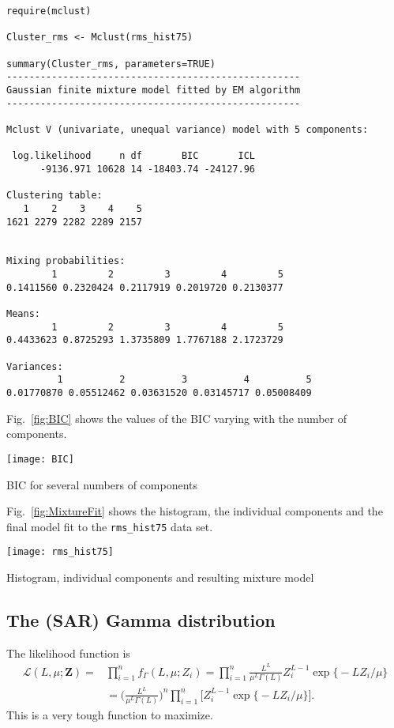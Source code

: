 \begin{lstlisting}
require(mclust)

Cluster_rms <- Mclust(rms_hist75)

summary(Cluster_rms, parameters=TRUE)
----------------------------------------------------
Gaussian finite mixture model fitted by EM algorithm 
----------------------------------------------------

Mclust V (univariate, unequal variance) model with 5 components:

 log.likelihood     n df       BIC       ICL
      -9136.971 10628 14 -18403.74 -24127.96

Clustering table:
   1    2    3    4    5 
1621 2279 2282 2289 2157 


Mixing probabilities:
        1         2         3         4         5 
0.1411560 0.2320424 0.2117919 0.2019720 0.2130377 

Means:
        1         2         3         4         5 
0.4433623 0.8725293 1.3735809 1.7767188 2.1723729 

Variances:
         1          2          3          4          5 
0.01770870 0.05512462 0.03631520 0.03145717 0.05008409 
\end{lstlisting}

Fig.~\ref{fig:BIC} shows the values of the BIC varying with the number of components.

\begin{marginfigure}
\centering
\texttt{[image: BIC]}
\caption{BIC for several numbers of components}
\label{fig:BIC}
\end{marginfigure}

Fig.~\ref{fig:MixtureFit} shows the histogram, the individual components and the final model fit to the \verb|rms_hist75| data set.

\begin{marginfigure}
\centering
\texttt{[image: rms\_hist75]}
\caption{Histogram, individual components and resulting mixture model}
\label{fig:MixtureFit}
\end{marginfigure}


\subsection{The (SAR) Gamma distribution}

The likelihood function is 
\begin{align}
\mathcal L(L,\mu;\bm Z) =& \prod_{i=1}^{n}f_\Gamma(L,\mu; Z_i) = \prod_{i=1}^{n}\frac{L^L}{\mu^{L}\Gamma(L)} Z_i^{L-1} 
	\exp\big\{ -L Z_i / \mu
	\big\} \nonumber\\
	& = 
	\bigg(
	\frac{L^L}{\mu^{L}\Gamma(L)}
	\bigg)^n \prod_{i=1}^{n} \Big[Z_i^{L-1} \exp\big\{ -L Z_i / \mu
		\big\} \Big].
\end{align}
This is a very tough function to maximize.

